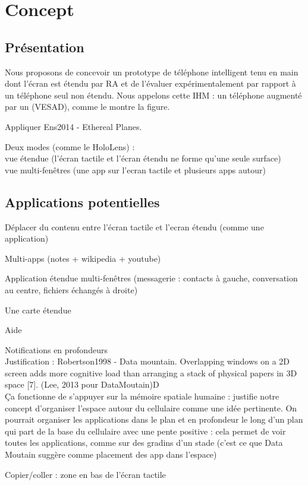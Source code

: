\chapter{Concept}
\label{ch:concept}

\section{Présentation}

Nous proposons de concevoir un prototype de téléphone intelligent tenu en main dont l'écran est étendu par RA et de l'évaluer expérimentalement par rapport à un téléphone seul non étendu. Nous appelons cette IHM : un téléphone augmenté par un  (VESAD), comme le montre la figure.


Appliquer Ens2014 - Ethereal Planes.

Deux modes (comme le HoloLens) :\\
vue étendue (l'écran tactile et l'écran étendu ne forme qu'une seule surface)\\
vue multi-fenêtres (une app sur l'ecran tactile et plusieurs apps autour)

\section{Applications potentielles}
Déplacer du contenu entre l'écran tactile et l'ecran étendu (comme une application)

Multi-apps (notes + wikipedia + youtube)

Application étendue multi-fenêtres (messagerie : contacts à gauche, conversation au centre, fichiers échangés à droite)


Une carte étendue


Aide


Notifications en profondeurs\\
Justification : Robertson1998 - Data mountain.  Overlapping windows on a 2D screen adds more cognitive load than arranging a stack of physical papers in  3D space [7]. (Lee, 2013 pour DataMoutain)D\\
Ça fonctionne de s'appuyer sur la mémoire spatiale humaine : justifie notre concept d'organiser l'espace autour du cellulaire comme une idée pertinente. On pourrait organiser les applications dans le plan et en profondeur le long d'un plan qui part de la base du cellulaire avec une pente positive : cela permet de voir toutes les applications, comme sur des gradins d'un stade (c'est ce que Data Moutain suggère comme placement des app dans l'espace)

Copier/coller : zone en bas de l'écran tactile